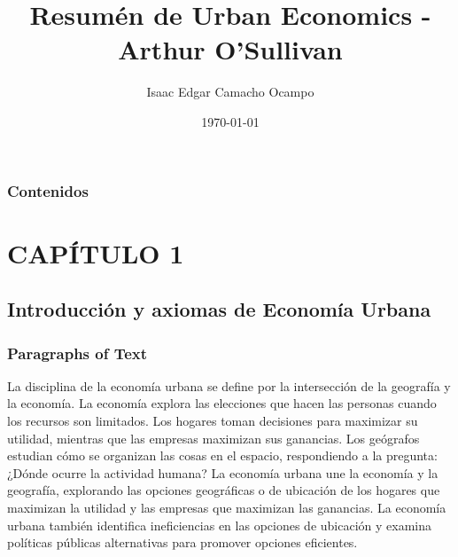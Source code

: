 \documentclass{beamer}
\title[Título]{Resumén de Urban Economics - Arthur O’Sullivan} %
\author{Isaac Edgar Camacho Ocampo} %
\institute[UGR] %
{
  Universidad de Buenos Aires - Facultad de Cs. Economicas \\ %
  \medskip
  \textit{autor@ugr.correo.es} %
}
\date{\today} %
\begin{document}
\begin{frame}
\titlepage %
\end{frame}

\begin{frame}
  \frametitle{Contenidos} %
  \tableofcontents
\end{frame}




\section{CAPÍTULO 1} %

\subsection{Introducción y axiomas de Economía Urbana} %

\begin{frame}
\frametitle{Paragraphs of Text}
La disciplina de la economía urbana se define por la intersección de la geografía y la economía. La
economía explora las elecciones que hacen las personas cuando los recursos son limitados. Los
hogares toman decisiones para maximizar su utilidad, mientras que las empresas maximizan sus
ganancias. Los geógrafos estudian cómo se organizan las cosas en el espacio, respondiendo a la
pregunta: ¿Dónde ocurre la actividad humana? La economía urbana une la economía y la
geografía, explorando las opciones geográficas o de ubicación de los hogares que maximizan la
utilidad y las empresas que maximizan las ganancias. La economía urbana también identifica
ineficiencias en las opciones de ubicación y examina políticas públicas alternativas para promover
opciones eficientes.\\~\\

\end{frame}
\end{document}

